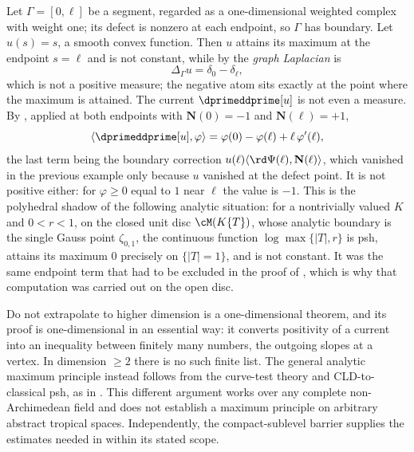 \begin{example}
\label{ex:ch15-boundary-max}
Let $\Gamma=[0,\ell]$ be a segment, regarded as a one-dimensional weighted
complex with weight one; its defect is nonzero at each endpoint, so $\Gamma$
has boundary.  Let $u(s)=s$, a smooth convex function.  Then $u$ attains its
maximum at the endpoint $s=\ell$ and is not constant, while by
 the \emph{graph Laplacian} is
\[
 \Delta_\Gamma u=\delta_0-\delta_\ell ,
\]
which is not a positive measure; the negative atom sits exactly at the point
where the maximum is attained.  The current $\dprimeddprime[u]$ is not even a
measure.  By , applied at both endpoints with
$\mathbf N(0)=-1$ and $\mathbf N(\ell)=+1$,
\[
 \langle\dprimeddprime[u],\varphi\rangle
 =\varphi(0)-\varphi(\ell)+\ell\,\varphi'(\ell) ,
\]
the last term being the boundary correction
$u(\ell)\langle\rd\Psi(\ell),\mathbf N(\ell)\rangle$, which vanished in the
previous example only because $u$ vanished at the defect point.  It is not
positive either: for $\varphi\geq0$ equal to $1$ near $\ell$ the value is
$-1$.  This is the polyhedral shadow of the
following analytic situation: for a nontrivially valued $K$ and
$0<r<1$, on the closed unit disc $\cM(K\{T\})$, whose
analytic boundary is the single Gauss point $\zeta_{0,1}$, the continuous
function $\log\max\{|T|,r\}$ is psh, attains its maximum $0$ precisely on
$\{|T|=1\}$, and is not constant.  It was the same endpoint term that had to
be excluded in the proof of , which is why that
computation was carried out on the open disc.
\end{example}

\begin{warning}{Do not extrapolate to higher dimension}
 is a one-dimensional theorem, and its proof is
one-dimensional in an essential way: it converts positivity of a current into
an inequality between finitely many numbers, the outgoing slopes at a vertex.
In dimension $\ge2$ there is no such finite list.  The general analytic
maximum principle instead follows from the curve-test theory and
CLD-to-classical psh, as in .  This different
argument works over any complete non-Archimedean field and does not
establish a maximum principle on arbitrary abstract tropical spaces.
Independently, the compact-sublevel barrier
 supplies the estimates needed in
 within its stated scope.
\end{warning}

